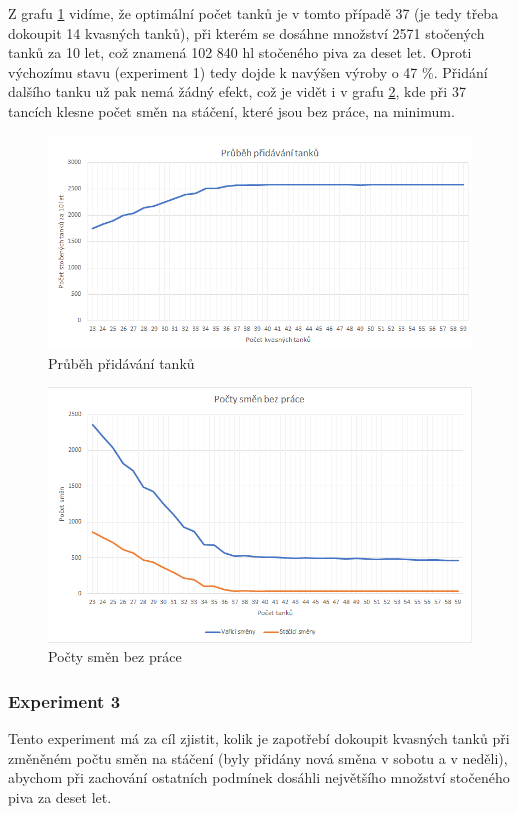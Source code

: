 \documentclass[11pt,a4paper]{article}
\begin{document}
Z grafu \ref{fig:exp2tanky} vidíme, že optimální počet tanků je v tomto případě 37 (je tedy třeba dokoupit 14 kvasných tanků), při kterém se dosáhne množství 2571 stočených tanků za 10 let, což znamená 102 840 hl stočeného piva za deset let. Oproti výchozímu stavu (experiment 1) tedy dojde k navýšen výroby o 47 \%. Přidání dalšího tanku už pak nemá žádný efekt, což je vidět i v grafu \ref{fig:exp2smeny}, kde při 37 tancích klesne počet směn na stáčení, které jsou bez práce, na minimum.
\begin{figure}[H]
  \centering
  \includegraphics[width=15cm]{exp2tanky.png}
  \caption{Průběh přidávání tanků}
  \label{fig:exp2tanky}
\end{figure}

\begin{figure}[H]
  \centering
  \includegraphics[width=15cm]{exp2smeny.png}
  \caption{Počty směn bez práce}
  \label{fig:exp2smeny}
\end{figure}


\subsubsection{Experiment 3}
Tento experiment má za cíl zjistit, kolik je zapotřebí dokoupit kvasných tanků při změněném počtu směn na stáčení (byly přidány nová směna v sobotu a v neděli), abychom při zachování ostatních podmínek dosáhli největšího množství stočeného piva za deset let.
\end{document}
